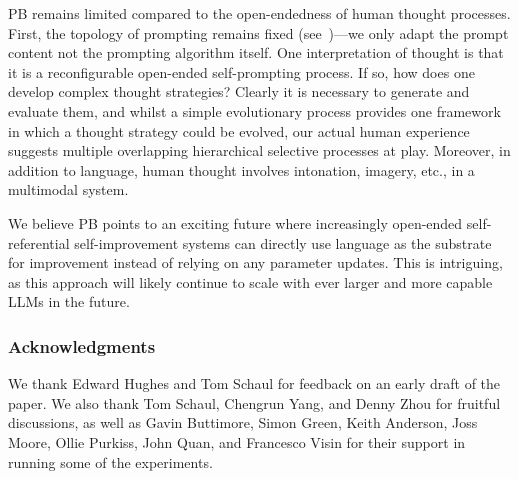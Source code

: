 \documentclass{article} %
\begin{document}
PB remains limited compared to the open-endedness of human thought processes. First, the topology of prompting remains fixed (see~)---we only adapt the prompt content not the prompting algorithm itself. One interpretation of thought is that it is a reconfigurable open-ended self-prompting process. If so, how does one develop complex thought strategies? Clearly it is necessary to generate and evaluate them, and whilst a simple evolutionary process provides one framework in which a thought strategy could be evolved, our actual human experience suggests multiple overlapping hierarchical selective processes at play. Moreover, in addition to language, human thought involves intonation, imagery, etc., in a multimodal system. 

We believe PB points to an exciting future where increasingly open-ended self-referential self-improvement systems can directly use language as the substrate for improvement instead of relying on any parameter updates. This is intriguing, as this approach will likely continue to scale with ever larger and more capable LLMs in the future. 

\clearpage

\subsubsection*{Acknowledgments}
We thank Edward Hughes and Tom Schaul for feedback on an early draft of the paper. We also thank Tom Schaul, Chengrun Yang, and Denny Zhou for fruitful discussions, as well as Gavin Buttimore, Simon Green, Keith Anderson, Joss Moore, Ollie Purkiss, John Quan, and Francesco Visin for their support in running some of the experiments.




\newpage
\appendix
\end{document}
